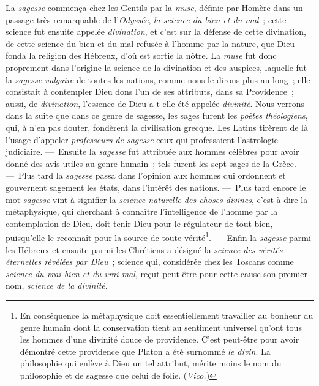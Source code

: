 \documentclass[french,twoside]{book} %
\begin{document}
La {\itshape sagesse} commença chez les Gentils par la {\itshape muse}, définie par Homère dans un passage très remarquable de l’{\itshape Odyssée}, \emph{{\itshape la science du bien et du mal}} ; cette science fut ensuite appelée {\itshape divination}, et c’est sur la défense de cette divination, de cette science du bien et du mal refusée à l’homme par la nature, que Dieu fonda la religion des Hébreux, d’où est sortie la nôtre. La {\itshape muse} fut donc proprement dans l’origine la science de la divination et des auspices, laquelle fut la {\itshape sagesse vulgaire} de toutes les nations, comme nous le dirons plus au long ; elle consistait à contempler Dieu dons l’un de ses attributs, dans sa Providence ; aussi, de {\itshape divination}, l’essence de Dieu a-t-elle été appelée {\itshape divinité}. Nous verrons dans la suite que dans ce genre de sagesse, les sages furent les {\itshape poètes théologiens}, qui, à n’en  pas douter, fondèrent la civilisation grecque. Les Latins tirèrent de là l’usage d’appeler {\itshape professeurs de sagesse} ceux qui professaient l’astrologie judiciaire. — Ensuite la {\itshape sagesse} fut attribuée aux hommes célèbres pour avoir donné des avis utiles au genre humain ; tels furent les sept sages de la Grèce. — Plus tard la {\itshape sagesse} passa dans l’opinion aux hommes qui ordonnent et gouvernent sagement les états, dans l’intérêt des nations. — Plus tard encore le mot {\itshape sagesse} vint à signifier la {\itshape science naturelle des choses divines}, c’est-à-dire la métaphysique, qui cherchant à connaître l’intelligence de l’homme par la contemplation de Dieu, doit tenir Dieu pour le régulateur de tout bien, puisqu’elle le reconnaît pour la source de toute vérité\footnote{En conséquence la métaphysique doit essentiellement travailler au bonheur du genre humain dont la conservation tient au sentiment universel qu’ont tous les hommes d’une divinité douce de providence. C’est peut-être pour avoir démontré cette providence que Platon a été surnommé {\itshape le divin}. La philosophie qui enlève à Dieu un tel attribut, mérite moins le nom du philosophie et de sagesse que celui de folie. ({\itshape Vico.})}. — Enfin la {\itshape sagesse} parmi les Hébreux et ensuite parmi les Chrétiens a désigné la {\itshape science des vérités éternelles révélées par Dieu} ; science qui, considérée chez les Toscans comme {\itshape science du vrai bien et du vrai mal}, reçut peut-être pour cette cause son premier nom, {\itshape science de la divinité}.\par
\end{document}
